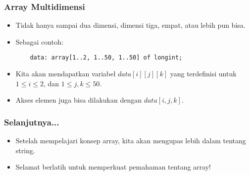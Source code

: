 \documentclass{beamer}
\begin{document}
\begin{frame}[fragile]
\frametitle{Array Multidimensi}
\begin{itemize}
	\item Tidak hanya sampai dua dimensi, dimensi tiga, empat, atau lebih pun bisa.
	\item Sebagai contoh:
	\begin{lstlisting}
	data: array[1..2, 1..50, 1..50] of longint;
	\end{lstlisting}
	\item Kita akan mendapatkan variabel $data[i][j][k]$ yang terdefinisi untuk $1 \le i \le 2$, dan $1 \le j, k \le 50$.
	\item Akses elemen juga bisa dilakukan dengan $data[i,j,k]$.
\end{itemize}
\end{frame}

\begin{frame}
\frametitle{Selanjutnya...}
\begin{itemize}
	\item Setelah mempelajari konsep array, kita akan mengupas lebih dalam tentang string.
	\item Selamat berlatih untuk memperkuat pemahaman tentang array!
\end{itemize}
\end{frame}
\end{document}
